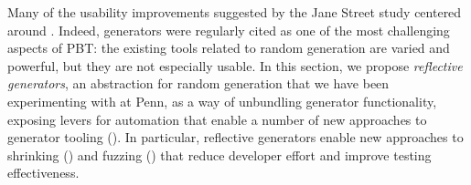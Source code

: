 



%
Many of the usability improvements suggested by the Jane Street study centered
around
.
Indeed, generators were regularly cited as one of the most challenging
aspects of PBT: the existing tools related to random generation are varied
and powerful, but
they are not especially usable.  In this section, we propose {\em reflective
generators}, an abstraction for random generation that we have been
experimenting with at Penn, as a way of unbundling generator
functionality, exposing levers for
automation that enable a number of new approaches to generator
tooling (). In particular, reflective
generators enable new
approaches to shrinking () and fuzzing
()
that reduce developer effort and improve testing
effectiveness.

